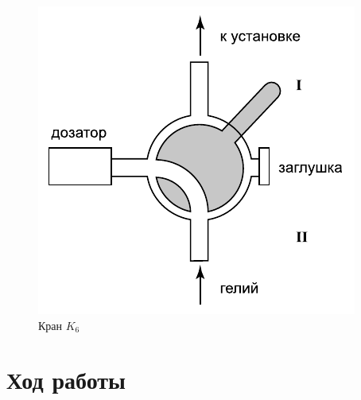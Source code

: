 \documentclass[12pt]{article}
\begin{document}
	\begin{figure}[h!]
	\caption{Кран $K_6$}
	\label{fig:scheme3}
	\begin{center}
	\includegraphics[scale=.5]{scheme3.png}
	\end{center}
	\end{figure}
	
	\section*{Ход работы}
	
\end{document}
